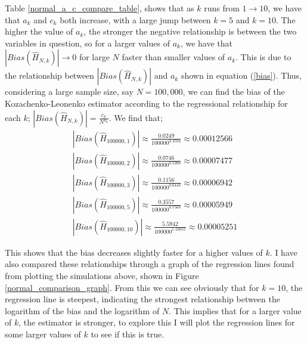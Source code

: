 \documentclass{article}
\begin{document}
Table \ref{normal_a_c_compare_table}, shows that as $k$ runs from $1 \to 10$, we have that $a_{k}$ and $c_{k}$ both increase, with a large jump between $k=5$ and $k=10$. The higher the value of $a_{k}$, the stronger the negative relationship is between the two variables in question, so for a larger values of $a_{k}$, we have that $|Bias(\hat{H}_{N, k})| \to 0$ for large $N$ faster than smaller values of $a_{k}$. This is due to the relationship between $|Bias(\hat{H}_{N, k})|$ and $a_{k}$ shown in equation (\ref{bias}). Thus, considering a large sample size, say $N=100,000$, we can find the bias of the Kozachenko-Leonenko estimator according to the regressional relationship for each $k$; $|Bias(\hat{H}_{N, k})| = \frac{c_{k}}{N^{a_{k}}}$. We find that;
\begin{gather*}
|Bias(\hat{H}_{100000, 1})| \approx  \frac{0.0249}{100000^{0.4594}}   \approx 0.00012566 \\
|Bias(\hat{H}_{100000, 2})| \approx  \frac{0.0746}{100000^{0.5998}}   \approx 0.00007477 \\
|Bias(\hat{H}_{100000, 3})| \approx  \frac{0.1156}{100000^{0.6443}}   \approx 0.00006942 \\
|Bias(\hat{H}_{100000, 5})| \approx  \frac{0.3557}{100000^{0.7568}}   \approx 0.00005949 \\
|Bias(\hat{H}_{100000, 10})| \approx  \frac{5.5942}{100000^{1.10055}}   \approx 0.00005251 
\end{gather*}

This shows that the bias decreases slightly faster for a higher values of $k$. I have also compared these relationships through a graph of the regression lines found from plotting the simulations above, shown in Figure \ref{normal_comparison_graph}. From this we can see obviously that for $k=10$, the regression line is steepest, indicating the strongest relationship between the logarithm of the bias and the logarithm of $N$. This implies that for a larger value of $k$, the estimator is stronger, to explore this I will plot the regression lines for some larger values of $k$ to see if this is true.
\end{document}
